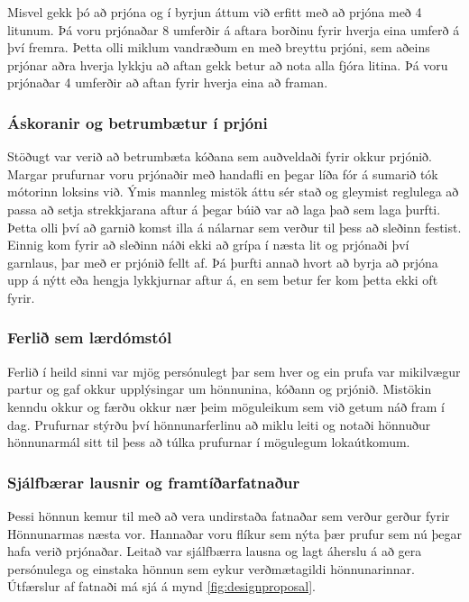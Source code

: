 Misvel gekk þó að prjóna og í byrjun áttum við erfitt með að prjóna með 4 litunum. Þá voru prjónaðar 8 umferðir á aftara borðinu fyrir hverja eina umferð á því fremra. Þetta olli miklum vandræðum en með breyttu prjóni, sem aðeins prjónar aðra hverja lykkju að aftan gekk betur að nota alla fjóra litina. Þá  voru prjónaðar 4 umferðir að aftan fyrir hverja eina að framan. 
\subsubsection{Áskoranir og betrumbætur í prjóni}
Stöðugt var verið að betrumbæta kóðana sem auðveldaði fyrir okkur prjónið. Margar prufurnar voru prjónaðir með handafli en þegar líða fór á sumarið tók mótorinn loksins við. Ýmis mannleg mistök áttu sér stað og gleymist reglulega að passa að setja strekkjarana aftur á þegar búið var að laga það sem laga þurfti. Þetta olli því að garnið komst illa á nálarnar sem verður til þess að sleðinn festist. Einnig kom fyrir að sleðinn náði ekki að grípa í næsta lit og prjónaði því garnlaus, þar með er prjónið fellt af. Þá þurfti annað hvort að byrja að prjóna upp á nýtt eða hengja lykkjurnar aftur á, en sem betur fer kom þetta ekki oft fyrir. 
\subsubsection{Ferlið sem lærdómstól}
Ferlið í heild sinni var mjög persónulegt þar sem hver og ein prufa var mikilvægur partur og gaf okkur upplýsingar um hönnunina, kóðann og prjónið. Mistökin kenndu okkur og færðu okkur nær þeim möguleikum sem við getum náð fram í dag. Prufurnar stýrðu því hönnunarferlinu að miklu leiti og notaði hönnuður hönnunarmál sitt til þess að túlka prufurnar í mögulegum lokaútkomum. 
\subsubsection{Sjálfbærar lausnir og framtíðarfatnaður}
Þessi hönnun kemur til með að vera undirstaða fatnaðar sem verður gerður fyrir Hönnunarmas næsta vor. Hannaðar voru flíkur sem nýta þær prufur sem nú þegar hafa verið prjónaðar. Leitað var sjálfbærra lausna og lagt áherslu á að gera persónulega og einstaka hönnun sem eykur verðmætagildi hönnunarinnar. Útfærslur af fatnaði má sjá á mynd \ref{fig:designproposal}.

